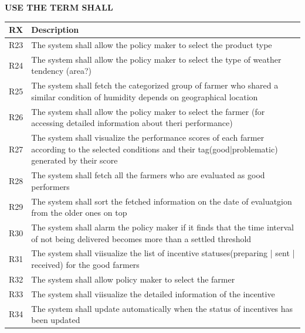 \textbf{USE THE TERM SHALL}
\begin{center}
    \setlength\arrayrulewidth{1pt}
    \begin{longtable}{|c|m{}|}
            
            \hline
            \rowcolor{myblue}\color{white}RX & \color{white}Description \\
            \hline
            \textsc{R23}     &   The system shall allow the policy maker to select the product type \\
            \hline
            \textsc{R24}  &    The system shall allow the policy maker to select the type of weather tendency (area?)\\
            \hline
            \textsc{R25}  &    The system shall fetch the categorized group of farmer who shared a similar condition of humidity depends on geographical location\\
            \hline
            \textsc{R26}  &    The system shall allow the policy maker to select the farmer (for accessing detailed information about theri performance) \\
            \hline
            \textsc{R27}  &    The system shall visualize the performance scores of each farmer according to the selected conditions and their tag(good|problematic) generated by their score\\
            \hline
            \textsc{R28}  &    The system shall fetch all the farmers who are evaluated as good performers\\
            \hline
            \textsc{R29}  &    The system shall sort the fetched information on the date of evaluatgion from the older ones on top\\
            \hline
            \textsc{R30}  &    The system shall alarm the policy maker if it finds that the time interval of not being delivered becomes more than a settled threshold \\
            \hline
            \textsc{R31}  &    The system shall viisualize the list of incentive statuses(preparing | sent | received) for the good farmers \\
            \hline
            \textsc{R32}  &    The system shall allow policy maker to select the farmer \\
            \hline
            \textsc{R33}  &    The system shall viisualize the detailed information of the incentive \\
            \hline
            \textsc{R34}  &    The system shall update automatically when the status of incentives has been updated \\

\end{longtable}
\end{center}
